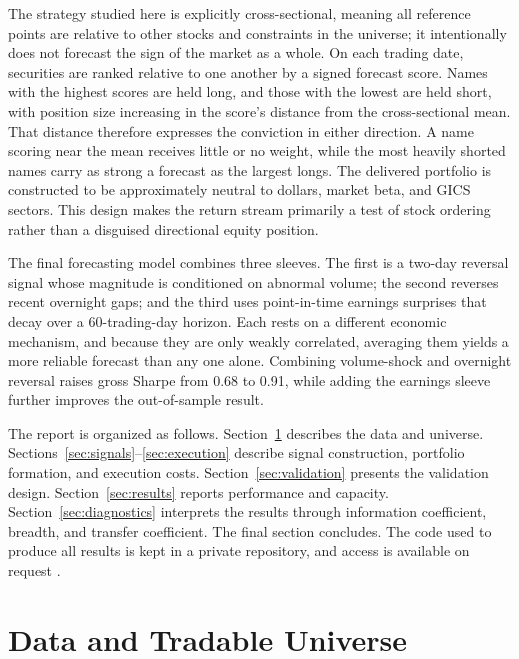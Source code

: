 \documentclass[11pt]{article}
\begin{document}
The strategy studied here is explicitly cross-sectional, meaning all reference points are relative to other stocks and constraints in the universe; it intentionally does not forecast the sign of the market as a whole. On each trading date, securities are ranked relative to one another by a signed forecast score. Names with the highest scores are held long, and those with the lowest are held short, with position size increasing in the score's distance from the cross-sectional mean. That distance therefore expresses the conviction in either direction. A name scoring near the mean receives little or no weight, while the most heavily shorted names carry as strong a forecast as the largest longs. The delivered portfolio is constructed to be approximately neutral to dollars, market beta, and GICS sectors. This design makes the return stream primarily a test of stock ordering rather than a disguised directional equity position.

The final forecasting model combines three sleeves. The first is a two-day reversal
signal whose magnitude is conditioned on abnormal volume; the second reverses recent
overnight gaps; and the third uses point-in-time earnings surprises that decay over a
60-trading-day horizon. Each rests on a different economic mechanism, and because they
are only weakly correlated, averaging them yields a more reliable forecast than
any one alone. Combining volume-shock and overnight reversal raises gross
Sharpe from 0.68 to 0.91, while adding the earnings sleeve further improves the out-of-sample
result.

The report is organized as follows. Section~\ref{sec:data} describes the data and universe. Sections~\ref{sec:signals}--\ref{sec:execution} describe signal construction, portfolio formation, and execution costs. Section~\ref{sec:validation} presents the validation design. Section~\ref{sec:results} reports performance and capacity. Section~\ref{sec:diagnostics} interprets the results through information coefficient, breadth, and transfer coefficient. The final section concludes. The code used to produce all results is kept in a private repository, and access is available on request \citep{huerta2026}.

\section{Data and Tradable Universe}
\label{sec:data}
\end{document}

